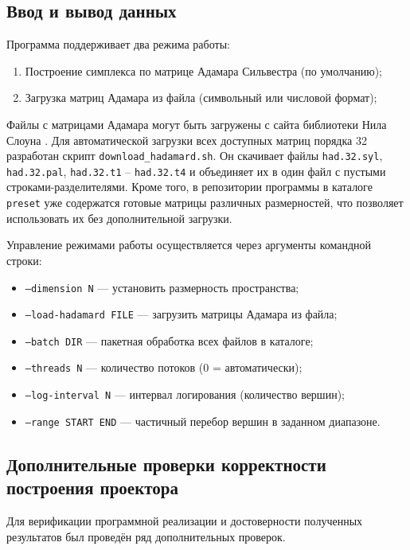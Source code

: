 \documentclass[main]{subfiles}
\begin{document}
\subsection{Ввод и вывод данных}

Программа поддерживает два режима работы:
\begin{enumerate}
    \item Построение симплекса по матрице Адамара Сильвестра (по умолчанию);
    \item Загрузка матриц Адамара из файла (символьный или числовой формат);
\end{enumerate}

Файлы с матрицами Адамара могут быть загружены с сайта библиотеки Нила Слоуна \cite{sloane_hadamard}. Для автоматической загрузки всех доступных матриц порядка 32 разработан скрипт \texttt{download\_hadamard.sh}. Он скачивает файлы \texttt{had.32.syl}, \texttt{had.32.pal}, \texttt{had.32.t1} – \texttt{had.32.t4} и объединяет их в один файл с пустыми строками-разделителями. Кроме того, в репозитории программы в каталоге \texttt{preset} уже содержатся готовые матрицы различных размерностей, что позволяет использовать их без дополнительной загрузки.

Управление режимами работы осуществляется через аргументы командной строки:
\begin{itemize}
    \item \texttt{--dimension N} — установить размерность пространства;
    \item \texttt{--load-hadamard FILE} — загрузить матрицы Адамара из файла;
    \item \texttt{--batch DIR} — пакетная обработка всех файлов в каталоге;
    \item \texttt{--threads N} — количество потоков (0 = автоматически);
    \item \texttt{--log-interval N} — интервал логирования (количество вершин);
    \item \texttt{--range START END} — частичный перебор вершин в заданном диапазоне.
\end{itemize}


\subsection{Дополнительные проверки корректности построения проектора}

Для верификации программной реализации и достоверности полученных результатов был проведён ряд дополнительных проверок.
\end{document}
